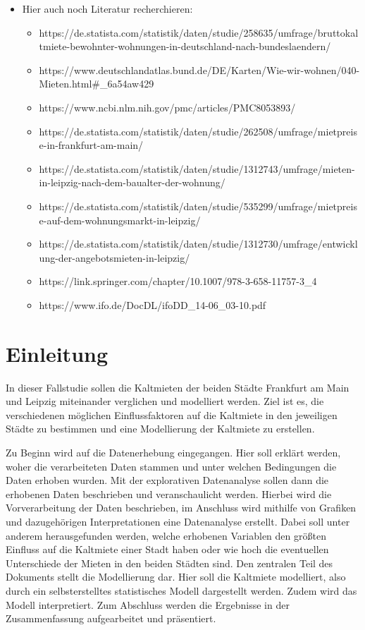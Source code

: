 \documentclass[
  a4paper,
  DIV=11]{scrartcl}
\providecommand{\tightlist}{%
  \setlength{\itemsep}{0pt}\setlength{\parskip}{0pt}}\usepackage{longtable,booktabs,array}
\begin{document}
\begin{itemize}
\tightlist
\item
  Hier auch noch Literatur recherchieren:

  \begin{itemize}
  \tightlist
  \item
    https://de.statista.com/statistik/daten/studie/258635/umfrage/bruttokaltmiete-bewohnter-wohnungen-in-deutschland-nach-bundeslaendern/
  \item
    https://www.deutschlandatlas.bund.de/DE/Karten/Wie-wir-wohnen/040-Mieten.html\#\_6a54aw429
  \item
    https://www.ncbi.nlm.nih.gov/pmc/articles/PMC8053893/
  \item
    https://de.statista.com/statistik/daten/studie/262508/umfrage/mietpreise-in-frankfurt-am-main/
  \item
    https://de.statista.com/statistik/daten/studie/1312743/umfrage/mieten-in-leipzig-nach-dem-baualter-der-wohnung/
  \item
    https://de.statista.com/statistik/daten/studie/535299/umfrage/mietpreise-auf-dem-wohnungsmarkt-in-leipzig/
  \item
    https://de.statista.com/statistik/daten/studie/1312730/umfrage/entwicklung-der-angebotsmieten-in-leipzig/
  \item
    https://link.springer.com/chapter/10.1007/978-3-658-11757-3\_4
  \item
    https://www.ifo.de/DocDL/ifoDD\_14-06\_03-10.pdf
  \end{itemize}
\end{itemize}

\hypertarget{einleitung}{%
\section{Einleitung}\label{einleitung}}

In dieser Fallstudie sollen die Kaltmieten der beiden Städte Frankfurt
am Main und Leipzig miteinander verglichen und modelliert werden. Ziel
ist es, die verschiedenen möglichen Einflussfaktoren auf die Kaltmiete
in den jeweiligen Städte zu bestimmen und eine Modellierung der
Kaltmiete zu erstellen.

Zu Beginn wird auf die Datenerhebung eingegangen. Hier soll erklärt
werden, woher die verarbeiteten Daten stammen und unter welchen
Bedingungen die Daten erhoben wurden. Mit der explorativen Datenanalyse
sollen dann die erhobenen Daten beschrieben und veranschaulicht werden.
Hierbei wird die Vorverarbeitung der Daten beschrieben, im Anschluss
wird mithilfe von Grafiken und dazugehörigen Interpretationen eine
Datenanalyse erstellt. Dabei soll unter anderem herausgefunden werden,
welche erhobenen Variablen den größten Einfluss auf die Kaltmiete einer
Stadt haben oder wie hoch die eventuellen Unterschiede der Mieten in den
beiden Städten sind. Den zentralen Teil des Dokuments stellt die
Modellierung dar. Hier soll die Kaltmiete modelliert, also durch ein
selbsterstelltes statistisches Modell dargestellt werden. Zudem wird das
Modell interpretiert. Zum Abschluss werden die Ergebnisse in der
Zusammenfassung aufgearbeitet und präsentiert.
\end{document}
